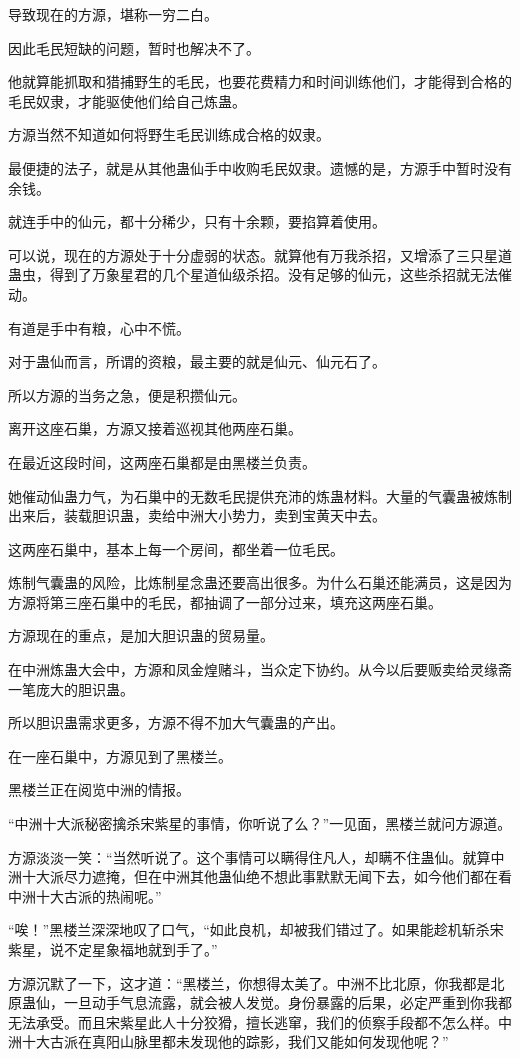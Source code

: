 \begin{this_body}
导致现在的方源，堪称一穷二白。

因此毛民短缺的问题，暂时也解决不了。

他就算能抓取和猎捕野生的毛民，也要花费精力和时间训练他们，才能得到合格的毛民奴隶，才能驱使他们给自己炼蛊。

方源当然不知道如何将野生毛民训练成合格的奴隶。

最便捷的法子，就是从其他蛊仙手中收购毛民奴隶。遗憾的是，方源手中暂时没有余钱。

就连手中的仙元，都十分稀少，只有十余颗，要掐算着使用。

可以说，现在的方源处于十分虚弱的状态。就算他有万我杀招，又增添了三只星道蛊虫，得到了万象星君的几个星道仙级杀招。没有足够的仙元，这些杀招就无法催动。

有道是手中有粮，心中不慌。

对于蛊仙而言，所谓的资粮，最主要的就是仙元、仙元石了。

所以方源的当务之急，便是积攒仙元。

离开这座石巢，方源又接着巡视其他两座石巢。

在最近这段时间，这两座石巢都是由黑楼兰负责。

她催动仙蛊力气，为石巢中的无数毛民提供充沛的炼蛊材料。大量的气囊蛊被炼制出来后，装载胆识蛊，卖给中洲大小势力，卖到宝黄天中去。

这两座石巢中，基本上每一个房间，都坐着一位毛民。

炼制气囊蛊的风险，比炼制星念蛊还要高出很多。为什么石巢还能满员，这是因为方源将第三座石巢中的毛民，都抽调了一部分过来，填充这两座石巢。

方源现在的重点，是加大胆识蛊的贸易量。

在中洲炼蛊大会中，方源和凤金煌赌斗，当众定下协约。从今以后要贩卖给灵缘斋一笔庞大的胆识蛊。

所以胆识蛊需求更多，方源不得不加大气囊蛊的产出。

在一座石巢中，方源见到了黑楼兰。

黑楼兰正在阅览中洲的情报。

“中洲十大派秘密擒杀宋紫星的事情，你听说了么？”一见面，黑楼兰就问方源道。

方源淡淡一笑：“当然听说了。这个事情可以瞒得住凡人，却瞒不住蛊仙。就算中洲十大派尽力遮掩，但在中洲其他蛊仙绝不想此事默默无闻下去，如今他们都在看中洲十大古派的热闹呢。”

“唉！”黑楼兰深深地叹了口气，“如此良机，却被我们错过了。如果能趁机斩杀宋紫星，说不定星象福地就到手了。”

方源沉默了一下，这才道：“黑楼兰，你想得太美了。中洲不比北原，你我都是北原蛊仙，一旦动手气息流露，就会被人发觉。身份暴露的后果，必定严重到你我都无法承受。而且宋紫星此人十分狡猾，擅长逃窜，我们的侦察手段都不怎么样。中洲十大古派在真阳山脉里都未发现他的踪影，我们又能如何发现他呢？”


\end{this_body}
